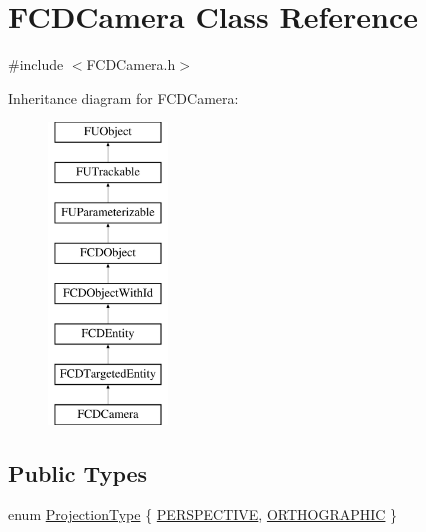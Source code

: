 \hypertarget{classFCDCamera}{
\section{FCDCamera Class Reference}
\label{classFCDCamera}
}


{\ttfamily \#include $<$FCDCamera.h$>$}

Inheritance diagram for FCDCamera:\begin{figure}[H]
\begin{center}
\leavevmode
\includegraphics[height=8.000000cm]{classFCDCamera}
\end{center}
\end{figure}
\subsection*{Public Types}
\begin{DoxyCompactItemize}
\item 
enum \hyperlink{classFCDCamera_a6afb103bc3857a0e059dc0174a48616d}{ProjectionType} \{ \hyperlink{classFCDCamera_a6afb103bc3857a0e059dc0174a48616da92a6de5e36f59329c5d290c6da31a5bc}{PERSPECTIVE}, 
\hyperlink{classFCDCamera_a6afb103bc3857a0e059dc0174a48616da34b6cc066d8993d265896628316c6138}{ORTHOGRAPHIC}
 \}
\end{DoxyCompactItemize}
